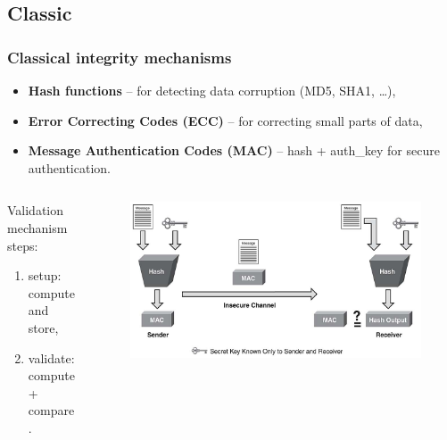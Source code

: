 \documentclass[compress]{beamer}
\begin{document}
\subsection{Classic}
\begin{frame}
\frametitle{\textbf{Classical integrity mechanisms}}
\begin{itemize}
	\footnotesize
	\item \textbf{Hash functions} -- for detecting data corruption (MD5, SHA1, \ldots),
	\item \textbf{Error Correcting Codes (ECC)} -- for correcting small parts of data,
	\item \textbf{Message Authentication Codes (MAC)} -- hash + auth\_key for secure authentication.
\end{itemize}
\begin{columns}
	\begin{column}{0.5\textwidth}
	\begin{block}{}
		Validation mechanism steps:
		\begin{enumerate}
			\item setup: compute and store,
			\item validate: compute + compare.
		\end{enumerate}
	\end{block}
	\end{column}
	\begin{column}{0.5\textwidth}
		\begin{figure}
			\centering
			\includegraphics[height=0.3\textheight]{img/hmac.jpg}
		\end{figure}
	\end{column}
\end{columns}
\end{frame}
\end{document}
